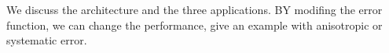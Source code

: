 We discuss the architecture and the three applications. BY modifing the error function, we can change the performance, give an example with anisotropic or systematic error.
